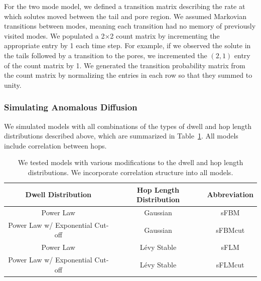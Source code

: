 \documentclass{article}
\begin{document}
  For the two mode model, we defined a transition matrix describing the rate at
  which solutes moved between the tail and pore region. We assumed Markovian transitions
  between modes, meaning each transition had no memory of previously visited modes. 
  We populated a 2$\times$2 count matrix by incrementing the appropriate entry by 1 each time step. 
  For example, if we observed the solute in the tails followed by a transition to 
  the pores, we incremented the $(2, 1)$ entry of the count matrix by 1. We generated
  the transition probability matrix from the count matrix by normalizing the 
  entries in each row so that they summed to unity.
 
  
  \subsubsection*{Simulating Anomalous Diffusion}

  We simulated models with all combinations of the types of dwell and hop length
  distributions described above, which are summarized in Table~\ref{table:anomalous_models}.
  All models include correlation between hops.
  \begin{table}[!htb]
	  \centering
	  \begin{tabular}{|c|c|c|}
	  \hline
	  Dwell Distribution                & Hop Length Distribution & Abbreviation \\
	  \hline
      Power Law                         & Gaussian                & sFBM         \\
      Power Law w/ Exponential Cut-off  & Gaussian                & sFBMcut      \\
      Power Law                         & L\'evy Stable           & sFLM         \\
      Power Law w/ Exponential Cut-off  & L\'evy Stable           & sFLMcut      \\
	  \hline
	  \end{tabular}
	  \caption{We tested models with various modifications to the dwell and hop
	  length distributions. We incorporate correlation structure into all models.}\label{table:anomalous_models}
 \end{table}
\end{document}
